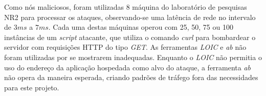 Como nós maliciosos, foram utilizadas 8 máquina do laboratório de pesquisas NR2 para processar os ataques, observando-se uma latência de rede no intervalo de $3ms$ a $7ms$. Cada uma destas máquinas operou com 25, 50, 75 ou 100 instâncias de um \emph{script} atacante, que utiliza o comando \emph{curl} para bombardear o servidor com requisições HTTP do tipo \emph{GET}. As ferramentas \emph{LOIC} e \emph{ab} não foram utilizadas por se mostrarem inadequadas. Enquanto o \emph{LOIC} não permitia o uso do endereço da aplicação hospedada como alvo do ataque, a ferramenta \emph{ab} não opera da maneira esperada, criando padrões de tráfego fora das necessidades para este projeto.


